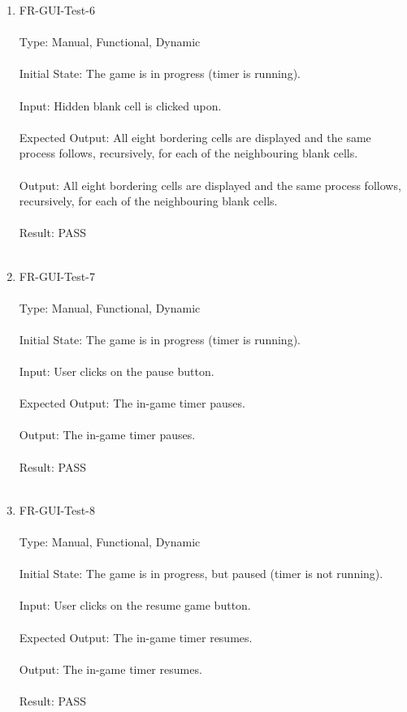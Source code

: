\documentclass[12pt, titlepage]{article}
\begin{document}
\begin{enumerate}
\newpage
\item{FR-GUI-Test-6\\\\}
Type: Manual, Functional, Dynamic\\\\			
Initial State: The game is in progress (timer is running).\\\\
Input: Hidden blank cell is clicked upon.\\\\
Expected Output: All eight bordering cells are displayed and the same process follows, recursively, for each of the
neighbouring blank cells. \\\\
Output: All eight bordering cells are displayed and the same process follows, recursively, for each of the
neighbouring blank cells.\\\\
Result: PASS\\\\

\item{FR-GUI-Test-7\\\\}
Type: Manual, Functional, Dynamic\\\\				
Initial State: The game is in progress (timer is running).\\\\
Input: User clicks on the pause button.\\\\					
Expected Output: The in-game timer pauses.\\\\
Output: The in-game timer pauses.\\\\
Result: PASS\\\\

\newpage
\item{FR-GUI-Test-8\\\\}
Type: Manual, Functional, Dynamic\\\\				
Initial State: The game is in progress, but paused (timer is not running).\\\\
Input: User clicks on the resume game button. \\\\
Expected Output: The in-game timer resumes. \\\\
Output: The in-game timer resumes. \\\\
Result: PASS \\\\


\end{enumerate}
\end{document}
